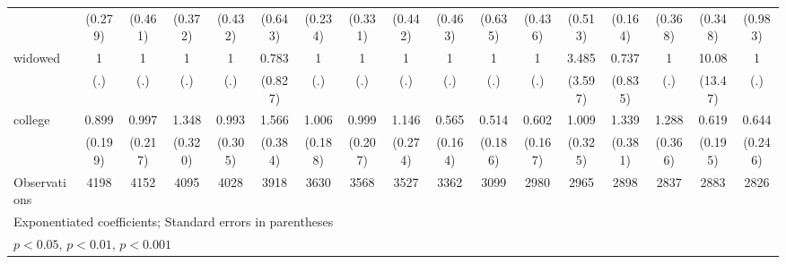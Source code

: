 {\begin{tabular}{l*{16}{c}}
                    &     (0.279)         &     (0.461)         &     (0.372)         &     (0.432)         &     (0.643)         &     (0.234)         &     (0.331)         &     (0.442)         &     (0.463)         &     (0.635)         &     (0.436)         &     (0.513)         &     (0.164)         &     (0.368)         &     (0.348)         &     (0.983)         \\
[1em]
widowed             &           1         &           1         &           1         &           1         &       0.783         &           1         &           1         &           1         &           1         &           1         &           1         &       3.485         &       0.737         &           1         &       10.08         &           1         \\
                    &         (.)         &         (.)         &         (.)         &         (.)         &     (0.827)         &         (.)         &         (.)         &         (.)         &         (.)         &         (.)         &         (.)         &     (3.597)         &     (0.835)         &         (.)         &     (13.47)         &         (.)         \\
[1em]
college             &       0.899         &       0.997         &       1.348         &       0.993         &       1.566         &       1.006         &       0.999         &       1.146         &       0.565\sym{*}  &       0.514         &       0.602         &       1.009         &       1.339         &       1.288         &       0.619         &       0.644         \\
                    &     (0.199)         &     (0.217)         &     (0.320)         &     (0.305)         &     (0.384)         &     (0.188)         &     (0.207)         &     (0.274)         &     (0.164)         &     (0.186)         &     (0.167)         &     (0.325)         &     (0.381)         &     (0.366)         &     (0.195)         &     (0.246)         \\
\hline
Observations        &        4198         &        4152         &        4095         &        4028         &        3918         &        3630         &        3568         &        3527         &        3362         &        3099         &        2980         &        2965         &        2898         &        2837         &        2883         &        2826         \\
\hline\hline
\multicolumn{17}{l}{\footnotesize Exponentiated coefficients; Standard errors in parentheses}\\
\multicolumn{17}{l}{\footnotesize \sym{*} \(p<0.05\), \sym{**} \(p<0.01\), \sym{***} \(p<0.001\)}\\
\end{tabular}
}
